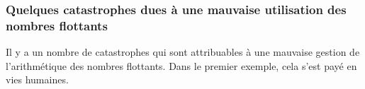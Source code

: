 \documentclass{magnolia}
\begin{document}




\subsubsection{Quelques catastrophes dues à une mauvaise utilisation des nombres flottants}

Il y a un nombre de catastrophes qui sont
attribuables à une mauvaise gestion de l'arithmétique des nombres flottants.
Dans le premier exemple, cela s'est payé en vies humaines.
\end{document}

